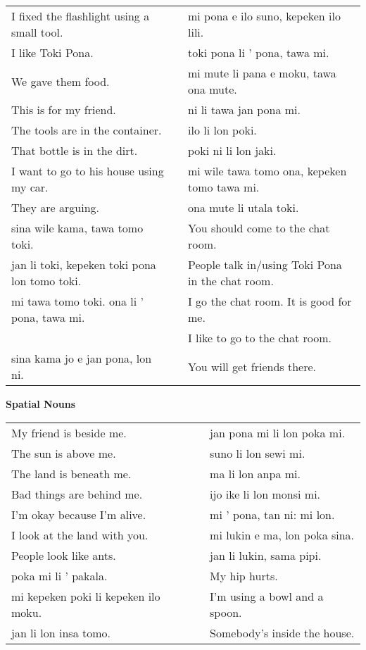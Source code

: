 \begin{supertabular}{p{5,5cm}|ll}
I fixed the flashlight using a small tool.  && mi pona e ilo suno, kepeken ilo lili. \\ %
I like Toki Pona.  && toki pona li ' pona, tawa mi. \\ %
We gave them food.  && mi mute li pana e moku, tawa ona mute. \\ %
This is for my friend.  && ni li tawa jan pona mi. \\ %
The tools are in the container.  && ilo li lon poki. \\ %
That bottle is in the dirt.  && poki ni li lon jaki. \\ %
I want to go to his house using my car.  && mi wile tawa tomo ona, kepeken tomo tawa mi. \\ %
They are arguing. && ona mute li utala toki. \\ %
sina wile kama, tawa tomo toki.  && You should come to the chat room. \\
jan li toki, kepeken toki pona lon tomo toki.  && People talk in/using Toki Pona in the chat room. \\
mi tawa tomo toki. ona li ' pona, tawa mi.  && I go the chat room. It is good for me. \\
                                         && I like to go to the chat room. \\ %
sina kama jo e jan pona, lon ni.  && You will get friends there. \\
\end{supertabular} 

\textbf{Spatial Nouns} 
\label{'other_prepositions'}

\begin{supertabular}{p{5,5cm}|ll}
My friend is beside me. && jan pona mi li lon poka mi. \\ %
The sun is above me. && suno li lon sewi mi. \\ %
The land is beneath me. && ma li lon anpa mi. \\ %
Bad things are behind me. && ijo ike li lon monsi mi. \\ %
I'm okay because I'm alive. && mi ' pona, tan ni: mi lon. \\ %
I look at the land with you.  && mi lukin e ma, lon poka sina. \\ %
People look like ants.  && jan li lukin, sama pipi. \\ %
poka mi li ' pakala.  && My hip hurts. \\
mi kepeken poki li kepeken ilo moku.  && I'm using a bowl and a spoon. \\
jan li lon insa tomo.  && Somebody's inside the house. \\
\end{supertabular} 

